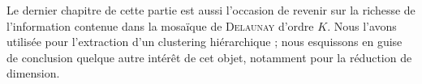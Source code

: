 \documentclass{these-ISSS} %
\begin{document}
\begin{enumerate}
    Le dernier chapitre de cette partie est aussi l'occasion de revenir sur la richesse de l'information contenue dans la mosaïque de \textsc{Delaunay} d'ordre $K$. Nous l'avons utilisée pour l'extraction d'un clustering hiérarchique ; nous esquissons en guise de conclusion quelque autre intérêt de cet objet, notamment pour la réduction de dimension.
\end{enumerate}




%









%







\end{document}
